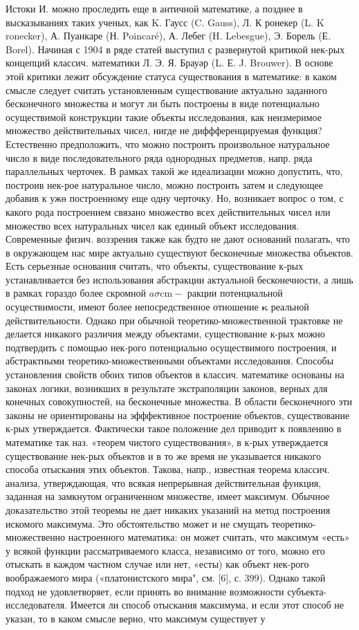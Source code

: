 \documentclass[10pt]{article}
\begin{document}
Истоки И. можно проследить еще в античной математике, а позднее в высказываниях таких ученых, как K. Гаусс (C. Gauss), Л. К ронекер (L. K ronecker), А. Пуанкаре (Н. Poincaré), А. Лебег (H. Lebesgue), Э. Борель (Е. Borel). Начиная с 1904 в ряде статей выступил с развернутой критикой нек-рых концепций классич. математики Л. Э. Я. Брауәр (L. Е. J. Brouwer). В основе этой критики лежит обсуждение статуса существования в математике: в каком смысле следует считать установленным существование актуально заданного бесконечного множества и могут ли быть построены в виде потенциально осуществимой конструкции такие объекты исследования, как неизмеримое множество действительных чисел, нигде не диффференцируемая функция? Естественно предположить, что можно построить произвольное натуральное число в виде последовательного ряда однородных предметов, напр. ряда параллельных черточек. В рамках такой же идеализации можно допустить, что, построив нек-рое натуральное число, можно построить затем и следующее добавив к ужө построенному еще одну черточку. Но, возникает вопрос о том, с какого рода построением связано множество всех действительных чисел или множество всех натуральных чисел как единый объект исследования. Современные физич. воззрения также как будто не дают оснований полагать, что в окружающем нас мире актуально существуют бесконечные множества объектов. Есть серьезные основания считать, что объекты, существование к-рых устанавливается без использования абстракции актуальной бесконечности, а лишь в рамках гораздо более скромной $a \sigma \mathrm{cm}-$ ракции потенциальной осуцествимости, имеют более непосредственное отношение $\boldsymbol{\kappa}$ реальной действительности. Однако при обычной теоретико-множественной трактовке не делается никакого различия между объектами, существование к-рых можно подтвердить с помощью нек-рого потенциально осуществимого построения, и абстрактными теоретико-множественными объектами исследования. Способы установления свойств обоих типов объектов в классич. математике основаны на законах логики, возникших в результате экстраполяции законов, верных для конечных совокупностей, на бесконечные множества. В области бесконечного эти законы не ориентированы на эфффективное построение объектов, существование к-рых утверждается. Фактически такое положение дел приводит к появлению в математике так наз. «теорем чистого существования», в к-рых утверждается существование нек-рых объектов и в то же время не указывается никакого способа отыскания этих объектов. Такова, напр., известная теорема классич. анализа, утверждающая, что всякая непрерывная действительная функция, заданная на замкнутом ограниченном множестве, имеет максимум. Обычное доказательство этой теоремы не дает никаких указаний на метод построения искомого максимума. Это обстоятельство может и не смущать теоретико-множественно настроенного математика: он может считать, что максимум «есть» у всякой функции рассматриваемого класса, независимо от того, можно его отыскать в каждом частном случае или нет, «есты) как объект нек-рого воображаемого мира («платонистского мира", см. [6], с. 399). Однако такой подход не удовлетворяет, если принять во внимание возможности субъекта-исследователя. Имеется ли способ отыскания максимума, и если этот способ не указан, то в каком смысле верно, что максимум существует у 
\end{document}
